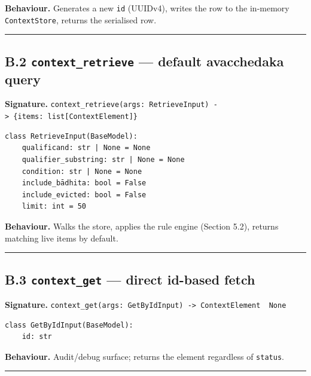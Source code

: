 \textbf{Behaviour.} Generates a new \texttt{id} (UUIDv4), writes the row to the in-memory \texttt{ContextStore}, returns the serialised row.

\begin{center}\rule{0.5\linewidth}{0.5pt}\end{center}

\subsection{\texorpdfstring{B.2 \texttt{context\_retrieve} --- default avacchedaka query}{B.2 context\_retrieve --- default avacchedaka query}}\label{b.2-context_retrieve-default-avacchedaka-query}

\textbf{Signature.} \texttt{context\_retrieve(args:\ RetrieveInput)\ -\textgreater{}\ \{items:\ list{[}ContextElement{]}\}}

\begin{verbatim}
class RetrieveInput(BaseModel):
    qualificand: str | None = None
    qualifier_substring: str | None = None
    condition: str | None = None
    include_bādhita: bool = False
    include_evicted: bool = False
    limit: int = 50
\end{verbatim}

\textbf{Behaviour.} Walks the store, applies the rule engine (Section 5.2), returns matching live items by default.

\begin{center}\rule{0.5\linewidth}{0.5pt}\end{center}

\subsection{\texorpdfstring{B.3 \texttt{context\_get} --- direct id-based fetch}{B.3 context\_get --- direct id-based fetch}}\label{b.3-context_get-direct-id-based-fetch}

\textbf{Signature.} \texttt{context\_get(args:\ GetByIdInput)\ -\textgreater{}\ ContextElement\ \textbar{}\ None}

\begin{verbatim}
class GetByIdInput(BaseModel):
    id: str
\end{verbatim}

\textbf{Behaviour.} Audit/debug surface; returns the element regardless of \texttt{status}.

\begin{center}\rule{0.5\linewidth}{0.5pt}\end{center}

